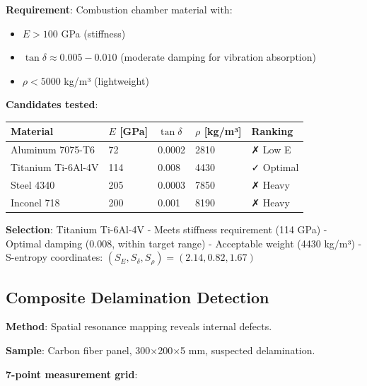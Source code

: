 \documentclass[12pt,a4paper]{article}
\begin{document}
\textbf{Requirement}: Combustion chamber material with:
\begin{itemize}
\item $E > 100$ GPa (stiffness)
\item $\tan\delta \approx 0.005-0.010$ (moderate damping for vibration absorption)
\item $\rho < 5000$ kg/m³ (lightweight)
\end{itemize}

\textbf{Candidates tested}:

\begin{center}
\begin{tabular}{|l|l|l|l|l|}
\hline
\textbf{Material} & \textbf{$E$ [GPa]} & \textbf{$\tan\delta$} & \textbf{$\rho$ [kg/m³]} & \textbf{Ranking} \\
\hline
Aluminum 7075-T6 & 72 & 0.0002 & 2810 & ✗ Low E \\
Titanium Ti-6Al-4V & 114 & 0.008 & 4430 & ✓ Optimal \\
Steel 4340 & 205 & 0.0003 & 7850 & ✗ Heavy \\
Inconel 718 & 200 & 0.001 & 8190 & ✗ Heavy \\
\hline
\end{tabular}
\end{center}

\textbf{Selection}: Titanium Ti-6Al-4V
- Meets stiffness requirement (114 GPa)
- Optimal damping (0.008, within target range)
- Acceptable weight (4430 kg/m³)
- S-entropy coordinates: $(S_E, S_{\delta}, S_{\rho}) = (2.14, 0.82, 1.67)$

\subsection{Composite Delamination Detection}

\textbf{Method}: Spatial resonance mapping reveals internal defects.

\textbf{Sample}: Carbon fiber panel, 300×200×5 mm, suspected delamination.

\textbf{7-point measurement grid}:

\begin{center}
\end{center}
\end{document}
